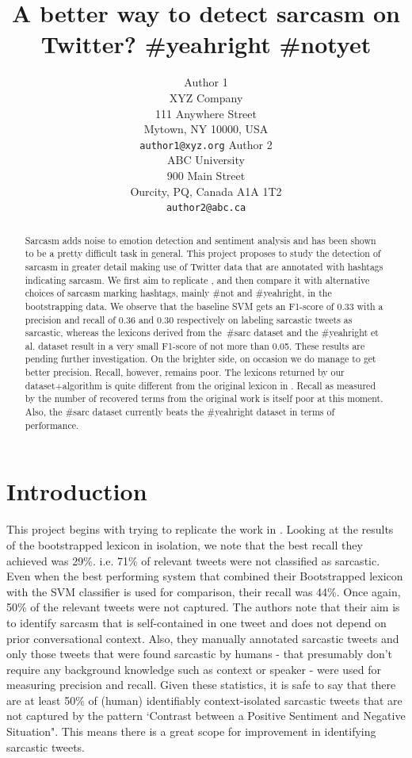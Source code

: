 \documentclass[11pt]{article}
\title{A better way to detect sarcasm on Twitter? \#yeahright \#notyet}
\author{Author 1\\
	    XYZ Company\\
	    111 Anywhere Street\\
	    Mytown, NY 10000, USA\\
	    {\tt author1@xyz.org}
	  \And
	Author 2\\
  	ABC University\\
  	900 Main Street\\
  	Ourcity, PQ, Canada A1A 1T2\\
  {\tt author2@abc.ca}}
\date{}
\begin{document}
\maketitle

\begin{abstract}
Sarcasm adds noise to emotion detection and sentiment analysis and has been shown to be a pretty difficult task in general. This project proposes to study the detection of sarcasm in greater detail making use of Twitter data that are annotated with hashtags indicating sarcasm. We first aim to replicate \cite{riloff2013sarcasm}, and then compare it with alternative choices of sarcasm marking hashtags, mainly \#not and \#yeahright, in the bootstrapping data. We observe that the baseline SVM gets an F1-score of 0.33 with a precision and recall of 0.36 and 0.30 respectively on labeling sarcastic tweets as sarcastic, whereas the lexicons derived from the \#sarc dataset and the \#yeahright et al. dataset result in a very small F1-score of not more than 0.05. These results are pending further investigation. On the brighter side, on occasion we do manage to get better precision. Recall, however, remains poor. The lexicons returned by our dataset+algorithm is quite different from the original lexicon in \cite{riloff2013sarcasm}. Recall as measured by the number of recovered terms from the original work is itself poor at this moment. Also, the \#sarc dataset currently beats the \#yeahright dataset in terms of performance. 
\end{abstract}

\section{Introduction}

This project begins with trying to replicate the work in \cite{riloff2013sarcasm}. Looking at the results of the bootstrapped lexicon in isolation, we note that the best recall they achieved was 29\%. i.e. 71\% of relevant tweets were not classified as sarcastic. Even when the best performing system that combined their Bootstrapped lexicon with the SVM classifier is used for comparison, their recall was 44\%. Once again, 50\% of the relevant tweets were not captured. The authors note that their aim is to identify sarcasm that is self-contained in one tweet and does not depend on prior conversational context. Also, they manually annotated sarcastic tweets and only those tweets that were found sarcastic by humans - that presumably don't require any background knowledge such as context or speaker - were used for measuring precision and recall. Given these statistics, it is safe to say that there are at least 50\% of (human) identifiably context-isolated sarcastic tweets that are not captured by the pattern `Contrast between a Positive Sentiment and Negative Situation". This means there is a great scope for improvement in identifying sarcastic tweets.
\end{document}
